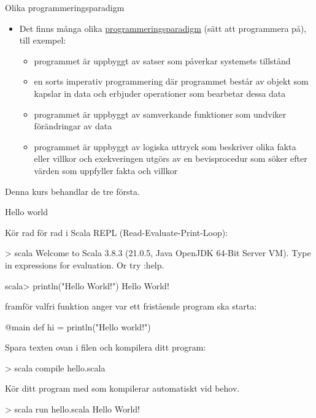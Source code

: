 
\begin{Slide}{Olika programmeringsparadigm}
\begin{itemize}
\item Det finns många olika \href{https://en.wikipedia.org/wiki/Programming_paradigm}{programmeringsparadigm} (sätt att programmera på), till exempel:
\begin{itemize}\SlideFontSmall
\item {} programmet är uppbyggt av satser som påverkar systemets tillstånd
\item {} en sorts imperativ programmering där programmet består av objekt som kapslar in data och erbjuder operationer som bearbetar dessa data
\item {} programmet är uppbyggt av samverkande funktioner som undviker förändringar av data
\item {} programmet är uppbyggt av logiska uttryck som beskriver olika fakta eller villkor och exekveringen utgörs av en bevisprocedur som söker efter värden som uppfyller fakta och villkor
\end{itemize}
\end{itemize}
Denna kurs behandlar de tre första.
\end{Slide}


\begin{Slide}{Hello world}\SlideFontSmall

Kör rad för rad i Scala REPL (Read-Evaluate-Print-Loop):
\begin{REPLsmall}
> scala
Welcome to Scala 3.8.3 (21.0.5, Java OpenJDK 64-Bit Server VM).
Type in expressions for evaluation. Or try :help.

scala> println("Hello World!")
Hello World!
\end{REPLsmall}

\pause
\noindent {} framför valfri funktion anger var ett fristående program ska starta:
\begin{Code}
@main def hi = println("Hello world!")
\end{Code}
\noindent Spara texten ovan i filen  och kompilera ditt program:
\begin{REPLsmall}
> scala compile hello.scala
\end{REPLsmall}
Kör ditt program med  som kompilerar automatiskt vid behov.
\begin{REPLsmall}
> scala run hello.scala
Hello World!
\end{REPLsmall}
\end{Slide}

